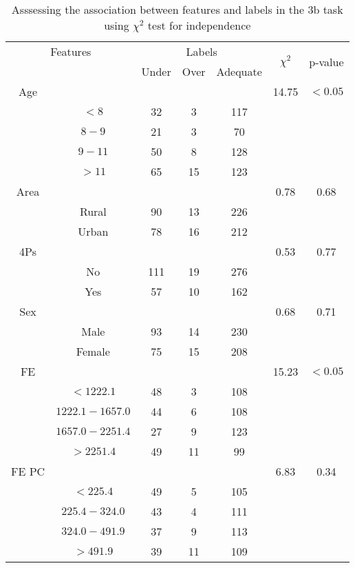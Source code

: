 \begin{table}[!htb]
\centering
\caption{Asssessing the association between features and labels in the 3b task using $\chi^2$ test for independence}
\label{tab:chitest_3b}
\begin{tabular}{c c | c c c| c | c}
\hline
\multicolumn{2}{c|}{Features}& \multicolumn{3}{c|}{Labels}& \multirow{2}{*}{$\chi^2$} & \multirow{2}{*}{p-value}\\ 
& & Under & Over & Adequate & & \\ 
\hline
Age &  &  &  & & 14.75 & $< 0.05$ \\ 
& $< 8$ & 32 & 3 & 117& & \\ 
& $8-9$ & 21 & 3 & 70& & \\ 
& $9-11$ & 50 & 8 & 128& & \\ 
& $> 11$ & 65 & 15 & 123& & \\ 
\hline 
Area &  &  &  & & 0.78 & 0.68 \\ 
& Rural & 90 & 13 & 226& & \\ 
& Urban & 78 & 16 & 212& & \\ 
\hline 
4Ps &  &  &  & & 0.53 & 0.77 \\ 
& No & 111 & 19 & 276& & \\ 
& Yes & 57 & 10 & 162& & \\ 
\hline 
Sex &  &  &  & & 0.68 & 0.71 \\ 
& Male & 93 & 14 & 230& & \\ 
& Female & 75 & 15 & 208& & \\ 
\hline 
FE &  &  &  & & 15.23 & $< 0.05$ \\ 
& $< 1222.1$ & 48 & 3 & 108& & \\ 
& $1222.1-1657.0$ & 44 & 6 & 108& & \\ 
& $1657.0-2251.4$ & 27 & 9 & 123& & \\ 
& $> 2251.4$ & 49 & 11 & 99& & \\ 
\hline 
FE PC &  &  &  & & 6.83 & 0.34 \\ 
& $< 225.4$ & 49 & 5 & 105& & \\ 
& $225.4-324.0$ & 43 & 4 & 111& & \\ 
& $324.0-491.9$ & 37 & 9 & 113& & \\ 
& $> 491.9$ & 39 & 11 & 109& & \\ 
\hline 
\end{tabular}
\end{table}
